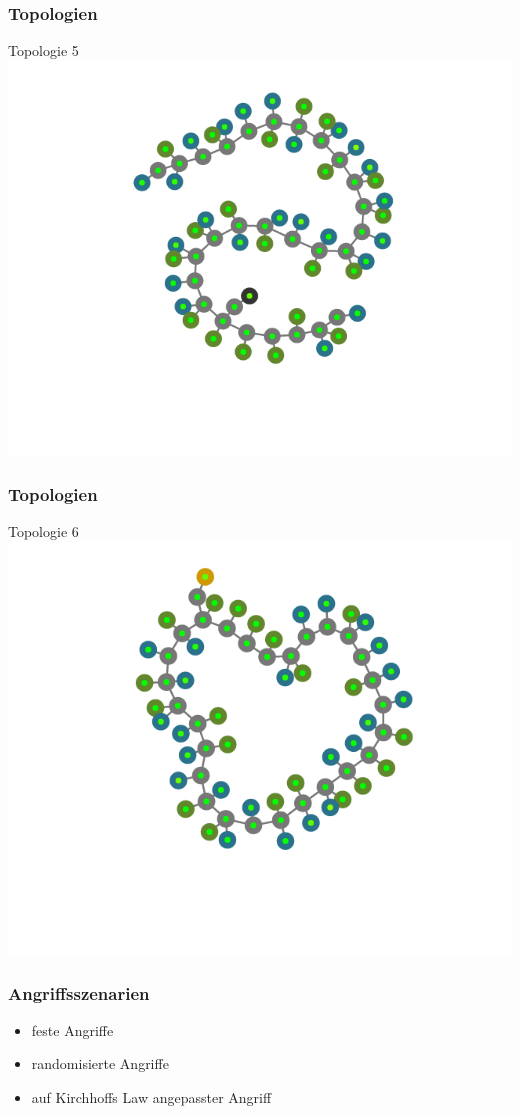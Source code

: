 \documentclass{beamer}
\begin{document}
\begin{frame}
	\frametitle{Topologien}
	\centering
	Topologie 5
	\includegraphics[height=\textheight]{pics/topo_5.png}
\end{frame}

\begin{frame}
	\frametitle{Topologien}
	\centering
	Topologie 6
	\includegraphics[height=\textheight]{pics/topo_6.png}
\end{frame}

\begin{frame}
	\frametitle{Angriffsszenarien}
	\begin{itemize}
		\item feste Angriffe
		\item randomisierte Angriffe
		\item auf Kirchhoffs Law angepasster Angriff
	\end{itemize}
\end{frame}
\end{document}
